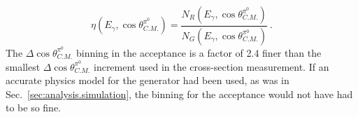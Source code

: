 \begin{equation}\label{eq:acceptance}
\eta(E_\gamma,\cos\theta^{\pi^0}_{C.M.}) = \frac{N_R(E_\gamma,\cos\theta^{\pi^0}_{C.M.})}{N_G(E_\gamma,\cos\theta^{\pi^0}_{C.M.})} \ .
\end{equation}
The $\Delta\cos\theta^{\pi^0}_{C.M.}$ binning in the acceptance is a factor of 2.4 finer than the smallest $\Delta\cos\theta^{\pi^0}_{C.M.}$ increment used in the cross-section measurement. If an accurate physics model for the generator had been used, as was in Sec.~\ref{sec:analysis.simulation}, the binning for the acceptance  would not have had to be so fine.
